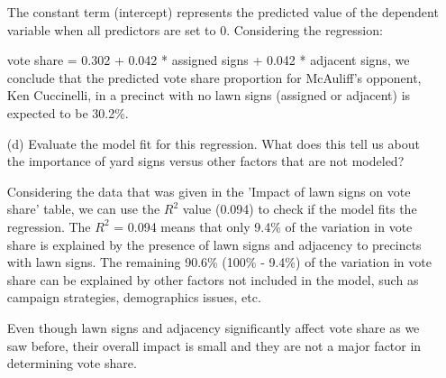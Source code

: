 \documentclass[12pt,letterpaper]{article}
\begin{document}
\begin{enumerate}
		The constant term (intercept) represents the predicted value of the dependent variable when all predictors are set to 0. Considering the regression: 
	
		vote share = 0.302 + 0.042 * assigned signs + 0.042 * adjacent signs, we conclude that the predicted vote share proportion for McAuliff’s opponent, Ken Cuccinelli, in a precinct with no lawn signs (assigned or adjacent) is expected to be 30.2\%.
	
		\vspace{2cm}
	
	

	\item [(d)] Evaluate the model fit for this regression.  What does this	tell us about the importance of yard signs versus other factors that are not modeled?
	\vspace{.5cm}
	
	Considering the data that was given in the 'Impact of lawn signs on vote share' table, we can use the $R^2$ value (0.094) to check if the model fits the regression. The $R^2$ = 0.094 means that only 9.4\% of the variation in vote share is explained by the presence of lawn signs and adjacency to precincts with lawn signs. The remaining 90.6\% (100\% - 9.4\%) of the variation in vote share can be explained by other factors not included in the model, such as campaign strategies, demographics issues, etc.
	
	Even though lawn signs and adjacency significantly affect vote share as we saw before, their overall impact is small and they are not a major factor in determining vote share.
	
	
	
\end{enumerate}  
\end{document}
